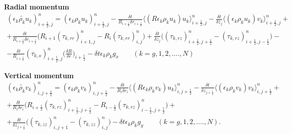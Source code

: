 {\bf Radial momentum}\\
%
\begin{eqnarray}
(\widetilde{\epsilon_k \rho_k u_k})_{i+\frac{1}{2},j}^{n} =
(\epsilon_k \rho_k u_k)_{i+\frac{1}{2},j}^{n} - 
\frac{\delta t}{R_{i+\frac{1}{2}} \delta r_{i+\frac{1}{2}}} 
\langle (R \epsilon_k \rho_k u_k) u_k \rangle_{i+\frac{1}{2},j}^{n} - 
\frac{\delta t} {\delta z_j} 
\langle (\epsilon_k \rho_k u_k) v_k \rangle_{i+\frac{1}{2},j}^{n} + \nonumber \\
+ \frac{\delta t} {R_{i+\frac{1}{2}} \delta r_{i+\frac{1}{2}}} 
\big(R_{i+1}(\tau_{k,rr})_{i+1,j}^{n} - R_i (\tau_{k,rr})_{i,j}^{n} \big) + 
\frac{\delta t} {\delta z_j} 
\big( (\tau_{k,rz})_{i+\frac{1}{2},j+\frac{1}{2}}^{n} - 
(\tau_{k,rz})_{i+\frac{1}{2},j-\frac{1}{2}}^{n} \big) - \nonumber \\
- \frac{\delta t} {R_{i+\frac{1}{2}}}
(\tau_{k,o})_{i+\frac{1}{2},j}^{n} 
\big( \frac{\delta R}{\delta r} \big)_{i+\frac{1}{2}}
-\delta t \epsilon_k \rho_k g_x
\qquad (k=g,1,2, ....,N)
\nonumber
\end{eqnarray}

{\bf Vertical momentum}\\
%
\begin{eqnarray}
(\widetilde{\epsilon_k \rho_k v_k})_{i,j+\frac{1}{2}}^{n} =
(\epsilon_k \rho_k v_k)_{i,j+\frac{1}{2}}^{n} -
\frac{\delta t}{R_{i} \delta r_{i}} 
\langle (R \epsilon_k \rho_k v_k) u_k \rangle_{i,j+\frac{1}{2}}^{n} -
\frac{\delta t} {\delta z_{j+\frac{1}{2}}} 
\langle (\epsilon_k \rho_k v_k) v_k \rangle_{i,j+\frac{1}{2}}^{n} + \nonumber \\
+ \frac{\delta t} {R_{i} \delta r_{i}} 
\big(R_{i+\frac{1}{2}}(\tau_{k,rz})_{i+\frac{1}{2},j+\frac{1}{2}}^{n} 
- R_{i-\frac{1}{2}} (\tau_{k,rz})_{i-\frac{1}{2},j+\frac{1}{2}}^{n} \big) + \nonumber \\
+ \frac{\delta t} {\delta z_{j+\frac{1}{2}}}
\big( (\tau_{k,zz})_{i,j+1}^{n} -
(\tau_{k,zz})_{i,j}^{n} \big)
- \delta t \epsilon_k \rho_k g_y
\qquad (k=g,1,2, ....,N).
\nonumber
\end{eqnarray}

